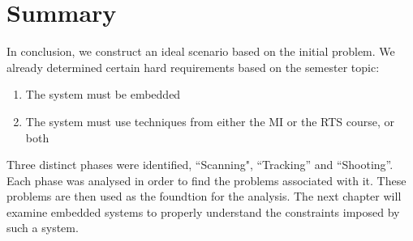 \section{Summary}
In conclusion, we construct an ideal scenario based on the initial problem. We
already determined certain hard requirements based on the semester topic:

\begin{enumerate}
	\item The system must be embedded
	\item The system must use techniques from either the MI or the RTS course, or both
\end{enumerate}

Three distinct phases were identified, ``Scanning", ``Tracking'' and
``Shooting''. Each phase was analysed in order to find the problems
associated with it. These problems are then used as the foundtion for the
analysis. The next chapter  will examine embedded
systems to properly understand the constraints imposed by such a system.
